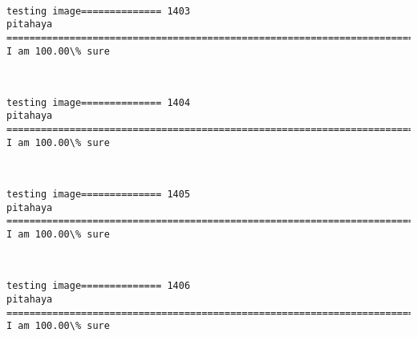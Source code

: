 \documentclass[11pt]{article}
\begin{document}
    \begin{center}
    \end{center}
    { \hspace*{\fill} \\}
    
    \begin{Verbatim}[commandchars=\\\{\}]
testing image============== 1403
pitahaya
============================================================================
I am 100.00\% sure

    \end{Verbatim}

    \begin{center}
    \end{center}
    { \hspace*{\fill} \\}
    
    \begin{Verbatim}[commandchars=\\\{\}]
testing image============== 1404
pitahaya
============================================================================
I am 100.00\% sure

    \end{Verbatim}

    \begin{center}
    \end{center}
    { \hspace*{\fill} \\}
    
    \begin{Verbatim}[commandchars=\\\{\}]
testing image============== 1405
pitahaya
============================================================================
I am 100.00\% sure

    \end{Verbatim}

    \begin{center}
    \end{center}
    { \hspace*{\fill} \\}
    
    \begin{Verbatim}[commandchars=\\\{\}]
testing image============== 1406
pitahaya
============================================================================
I am 100.00\% sure

    \end{Verbatim}
\end{document}
